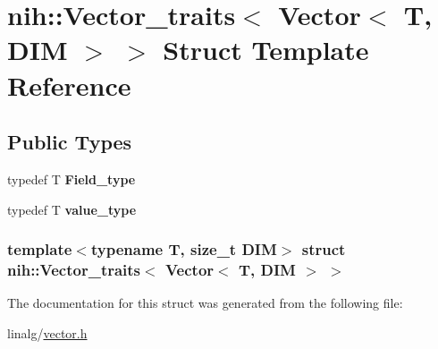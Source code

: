 \hypertarget{structnih_1_1_vector__traits_3_01_vector_3_01_t_00_01_d_i_m_01_4_01_4}{
\section{nih\-:\-:\-Vector\-\_\-traits$<$ \-Vector$<$ \-T, \-D\-I\-M $>$ $>$ \-Struct \-Template \-Reference}
\label{structnih_1_1_vector__traits_3_01_vector_3_01_t_00_01_d_i_m_01_4_01_4}
}
\subsection*{\-Public \-Types}
\begin{DoxyCompactItemize}
\item 
\hypertarget{structnih_1_1_vector__traits_3_01_vector_3_01_t_00_01_d_i_m_01_4_01_4_ad1379239123330d411ccde9bdde8b38a}{
typedef \-T {\bfseries \-Field\-\_\-type}}
\label{structnih_1_1_vector__traits_3_01_vector_3_01_t_00_01_d_i_m_01_4_01_4_ad1379239123330d411ccde9bdde8b38a}

\item 
\hypertarget{structnih_1_1_vector__traits_3_01_vector_3_01_t_00_01_d_i_m_01_4_01_4_a865a405f54f6c88d42a8cad4b2f7a1f3}{
typedef \-T {\bfseries value\-\_\-type}}
\label{structnih_1_1_vector__traits_3_01_vector_3_01_t_00_01_d_i_m_01_4_01_4_a865a405f54f6c88d42a8cad4b2f7a1f3}

\end{DoxyCompactItemize}
\subsubsection*{template$<$typename T, size\-\_\-t \-D\-I\-M$>$ struct nih\-::\-Vector\-\_\-traits$<$ Vector$<$ T, D\-I\-M $>$ $>$}



\-The documentation for this struct was generated from the following file\-:\begin{DoxyCompactItemize}
\item 
linalg/\hyperlink{vector_8h}{vector.\-h}\end{DoxyCompactItemize}
